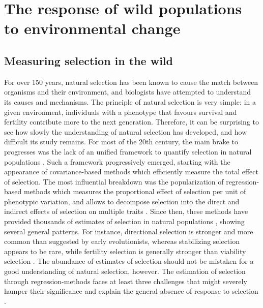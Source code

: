 
\section{The response of wild populations to environmental change}

\subsection{Measuring selection in the wild}
For over 150 years, natural selection has been known to cause the match between organisms and their environment, and biologists have attempted to understand its causes and mechanisms. The principle of natural selection is very simple: in a given environment, individuals with a phenotype that favours survival and fertility contribute more to the next generation. Therefore, it can be surprising to see how slowly the understanding of natural selection has developed, and how difficult its study remains. 
For most of the 20th century, the main brake to progresses was the lack of an unified framework to quantify selection in natural populations \parencite{Wade2006}. Such a framework progressively emerged, starting with the appearance of covariance-based methods \parencite{Robertson1966, Price1970} which efficiently measure the total effect of selection. The most influential breakdown was the popularization of regression-based methods \parencite{Lande1979,Lande1983} which measures the proportional effect of selection per unit of phenotypic variation, and allows to decompose selection into the direct and indirect effects of selection on multiple traits \parencite{Broodie1995}.
Since then, these methods have provided thousands of estimates of selection in natural populations \parencite{Kingsolver2001,Stinchcombe2008,Kingsolver2012}, showing several general patterns. For instance, directional selection is stronger and more common than suggested by early evolutionists, whereas stabilizing selection appears to be rare, while fertility selection is generally stronger than viability selection \parencite{Kingsolver2012}.
The abundance of estimates of selection should not be mistaken for a good understanding of natural selection, however. The estimation of selection through regression-methods faces at least three challenges that might severely hamper their significance and explain the general absence of response to selection \parencite{Merila2001, Brookfield2016}.

